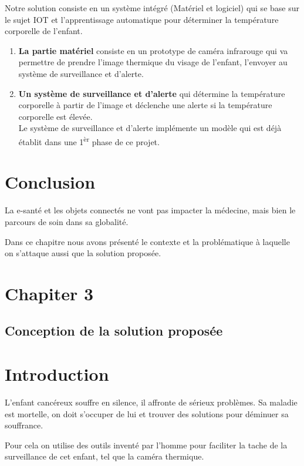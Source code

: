 \documentclass[12pt]{article}
\begin{document}
Notre solution consiste en un système intégré (Matériel et logiciel) qui se base sur le sujet IOT et l'apprentissage automatique pour déterminer la température corporelle de l'enfant.
\begin{enumerate}
	\item \textbf{La partie matériel} consiste en un prototype de caméra infrarouge qui va permettre de prendre l'image thermique du visage de l'enfant, l'envoyer au système de surveillance et  d'alerte.
	\item \textbf{Un système de surveillance et d'alerte} qui détermine la température corporelle à partir de l'image et déclenche une alerte si la température corporelle est élevée.\\
	Le système de surveillance et d'alerte implémente un modèle qui est déjà établit dans une 1\textsuperscript{èr} phase de ce projet.
\end{enumerate}

\section{Conclusion}
La e-santé et les objets connectés ne vont pas impacter  la médecine, mais bien le parcours de soin dans sa globalité.

Dans ce chapitre nous avons présenté le contexte et la problématique à laquelle on s'attaque aussi que la solution proposée.

\newpage
\rhead{}
\section*{\Huge{Chapiter 3}}
\subsection*{\huge{Conception de la solution proposée}}
\newpage
{}
\section{Introduction}
L'enfant cancéreux souffre en silence, il affronte de sérieux problèmes. Sa maladie est mortelle, on doit s’occuper de lui et trouver des solutions pour déminuer sa souffrance.

Pour cela on utilise des outils inventé par l'homme pour faciliter la tache de la surveillance de cet enfant, tel que la caméra thermique.
\end{document}
